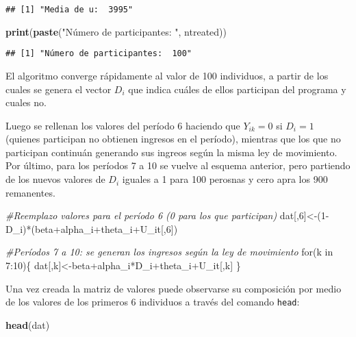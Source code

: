 \documentclass[]{article}
\newenvironment{Shaded}{\begin{snugshade}}{\end{snugshade}}
\newcommand{\KeywordTok}[1]{\textcolor[rgb]{0.13,0.29,0.53}{\textbf{{#1}}}}
\newcommand{\DecValTok}[1]{\textcolor[rgb]{0.00,0.00,0.81}{{#1}}}
\newcommand{\StringTok}[1]{\textcolor[rgb]{0.31,0.60,0.02}{{#1}}}
\newcommand{\CommentTok}[1]{\textcolor[rgb]{0.56,0.35,0.01}{\textit{{#1}}}}
\newcommand{\NormalTok}[1]{{#1}}
\begin{document}
\begin{verbatim}
## [1] "Media de u:  3995"
\end{verbatim}

\begin{Shaded}
\begin{Highlighting}[]
  \KeywordTok{print}\NormalTok{(}\KeywordTok{paste}\NormalTok{(}\StringTok{"Número de participantes: "}\NormalTok{, ntreated))  }
\end{Highlighting}
\end{Shaded}

\begin{verbatim}
## [1] "Número de participantes:  100"
\end{verbatim}

El algoritmo converge rápidamente al valor de 100 individuos, a partir
de los cuales se genera el vector $D_{i}$ que indica cuáles de ellos
participan del programa y cuales no.

Luego se rellenan los valores del período 6 haciendo que $Y_{ik}=0$ si
$D_{i}=1$ (quienes participan no obtienen ingresos en el período),
mientras que los que no participan continuán generando sus ingreos según
la misma ley de movimiento. Por último, para los períodos 7 a 10 se
vuelve al esquema anterior, pero partiendo de los nuevos valores de
$D_{i}$ iguales a 1 para 100 perosnas y cero apra los 900 remanentes.

\begin{Shaded}
\begin{Highlighting}[]
\CommentTok{#Reemplazo valores para el período 6 (0 para los que participan)}
\NormalTok{dat[,}\DecValTok{6}\NormalTok{]<-(}\DecValTok{1}\NormalTok{-D_i)*(beta+alpha_i+theta_i+U_it[,}\DecValTok{6}\NormalTok{])}


\CommentTok{#Períodos 7 a 10: se generan los ingresos según la ley de movimiento}
\NormalTok{for(k in }\DecValTok{7}\NormalTok{:}\DecValTok{10}\NormalTok{)\{}
  \NormalTok{dat[,k]<-beta+alpha_i*D_i+theta_i+U_it[,k]}
\NormalTok{\}}
\end{Highlighting}
\end{Shaded}

Una vez creada la matriz de valores puede observarse su composición por
medio de los valores de los primeros 6 individuos a través del comando
\texttt{head}:

\begin{Shaded}
\begin{Highlighting}[]
\KeywordTok{head}\NormalTok{(dat)}
\end{Highlighting}
\end{Shaded}
\end{document}
